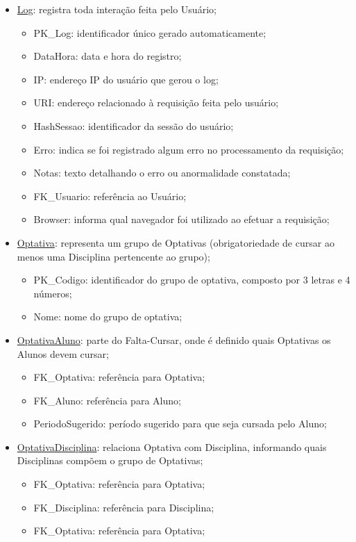 \documentclass[graduacao,brazil]{ThesisPUC}
\begin{document}
\begin{itemize}
	\item \underline{Log}: registra toda interação feita pelo Usuário;
	\begin{itemize}
		\item PK\_Log: identificador único gerado automaticamente;
		\item DataHora: data e hora do registro;
		\item IP: endereço IP do usuário que gerou o log;
		\item URI: endereço relacionado à requisição feita pelo usuário;
		\item HashSessao: identificador da sessão do usuário;
		\item Erro: indica se foi registrado algum erro no processamento da requisição;
		\item Notas: texto detalhando o erro ou anormalidade constatada;
		\item FK\_Usuario: referência ao Usuário;
		\item Browser: informa qual navegador foi utilizado ao efetuar a requisição;
	\end{itemize}

	\item \underline{Optativa}: representa um grupo de Optativas (obrigatoriedade de cursar ao menos uma Disciplina pertencente ao grupo);
	\begin{itemize}
		\item PK\_Codigo: identificador do grupo de optativa, composto por 3 letras e 4 números;
		\item Nome: nome do grupo de optativa;
	\end{itemize}

	\item \underline{OptativaAluno}: parte do Falta-Cursar, onde é definido quais Optativas os Alunos devem cursar;
	\begin{itemize}
		\item FK\_Optativa: referência para Optativa;
		\item FK\_Aluno: referência para Aluno;
		\item PeriodoSugerido: período sugerido para que seja cursada pelo Aluno;
	\end{itemize}

	\item \underline{OptativaDisciplina}: relaciona Optativa com Disciplina, informando quais Disciplinas compõem o grupo de Optativas;
	\begin{itemize}
		\item FK\_Optativa: referência para Optativa;
		\item FK\_Disciplina: referência para Disciplina;
		\item FK\_Optativa: referência para Optativa;
	\end{itemize}


\end{itemize}
\end{document}
